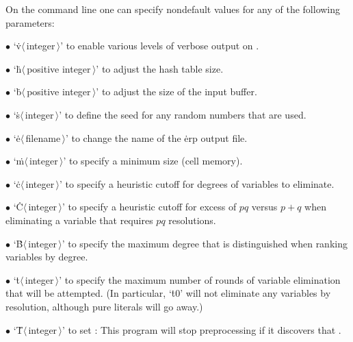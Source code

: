 On the command line one can specify nondefault values for any
of the
following parameters:
\smallskip
\item{$\bullet$}
`\.v$\langle\,$integer$\,\rangle$' to enable various levels of verbose
output on .
\item{$\bullet$}
`\.h$\langle\,$positive integer$\,\rangle$' to adjust the hash table size.
\item{$\bullet$}
`\.b$\langle\,$positive integer$\,\rangle$' to adjust the size of the input
buffer.
\item{$\bullet$}
`\.s$\langle\,$integer$\,\rangle$' to define the seed for any random numbers
that are used.
\item{$\bullet$}
`\.e$\langle\,$filename$\,\rangle$' to change the name
of the \.{erp} output file.
\item{$\bullet$}
`\.m$\langle\,$integer$\,\rangle$' to specify a minimum  size
(cell memory).
\item{$\bullet$}
`\.c$\langle\,$integer$\,\rangle$' to specify a heuristic cutoff for
degrees of variables to eliminate.
\item{$\bullet$}
`\.C$\langle\,$integer$\,\rangle$' to specify a heuristic cutoff for
excess of $pq$ versus $p+q$ when eliminating a variable that requires
$pq$ resolutions.
\item{$\bullet$}
`\.B$\langle\,$integer$\,\rangle$' to specify the maximum degree that is
distinguished when ranking variables by degree.
\item{$\bullet$}
`\.t$\langle\,$integer$\,\rangle$' to specify the maximum number of
rounds of variable elimination that will be attempted.
(In particular, `\.{t0}' will not eliminate any variables by resolution,
although pure literals will go away.)
\item{$\bullet$}
`\.T$\langle\,$integer$\,\rangle$' to set : This program will
stop preprocessing if it discovers that .

